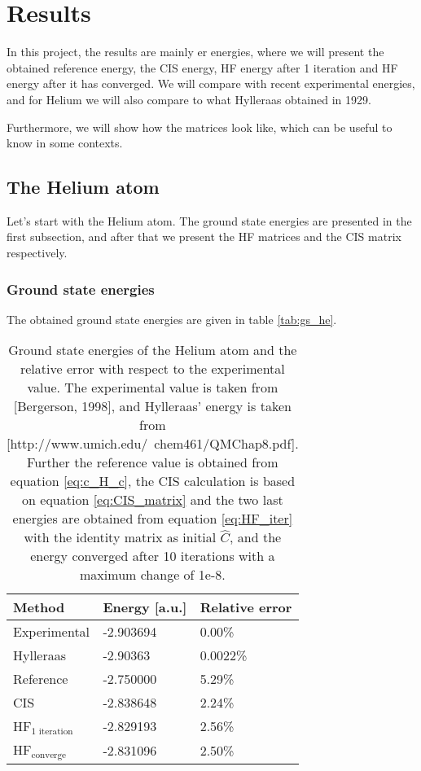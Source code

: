 \section{Results} \label{sec:results}
In this project, the results are mainly er energies, where we will present the obtained reference energy, the CIS energy, HF energy after 1 iteration and HF energy after it has converged. We will compare with recent experimental energies, and for Helium we will also compare to what Hylleraas obtained in 1929. 

Furthermore, we will show how the matrices look like, which can be useful to know in some contexts. 

\subsection{The Helium atom}
Let's start with the Helium atom. The ground state energies are presented in the first subsection, and after that we present the HF matrices and the CIS matrix respectively. 

\subsubsection{Ground state energies}
The obtained ground state energies are given in table \eqref{tab:gs_he}.
\begin{table} [H]
	\caption{Ground state energies of the Helium atom and the relative error with respect to the experimental value. The experimental value is taken from [Bergerson, 1998], and Hylleraas' energy is taken from [http://www.umich.edu/~chem461/QMChap8.pdf]. Further the reference value is obtained from equation \eqref{eq:c_H_c}, the CIS calculation is based on equation \eqref{eq:CIS_matrix} and the two last energies are obtained from equation \eqref{eq:HF_iter} with the identity matrix as initial $\hat{C}$, and the energy converged after 10 iterations with a maximum change of 1e-8.}
	\begin{tabularx}{\textwidth}{X|X|X} \hline\hline
		\textbf{Method}&\textbf{Energy} [a.u.]&\textbf{Relative error}\\ \hline
		Experimental & -2.903694 & 0.00\%  \\
		Hylleraas & -2.90363 & 0.0022\% \\
		Reference & -2.750000 & 5.29\% \\
		CIS & -2.838648 &  2.24\% \\
		HF$_{\text{1 iteration}}$ & -2.829193 & 2.56\% \\
		HF$_{\text{converge}}$ & -2.831096 & 2.50\% \\ \hline\hline
	\end{tabularx}
	\label{tab:gs_he}
\end{table}

